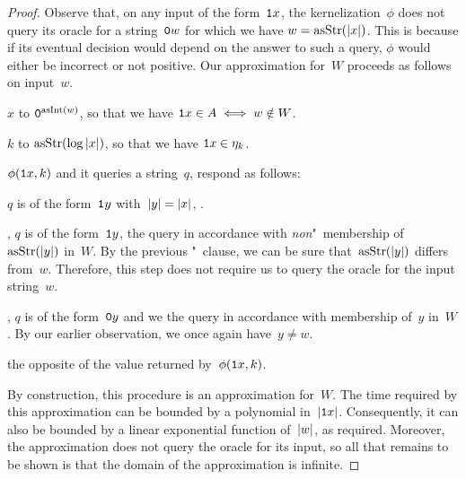\begin{proof}
  Observe that, on any input of the form~$\textnormal{\texttt{1}}x$, the kernelization~$\phi$ does not query its oracle for a string~$\textnormal{\texttt{0}}w$ for which we have $w = \operatorname{asStr}({\lvert x\rvert})$.
  This is because if its eventual decision would depend on the answer to such a query, $\phi$ would either be incorrect or not positive.
  Our approximation for~$W$ proceeds as follows on input~$w$.
  \begin{codelisting}
  \item
     $x$ to $\bits{0}^{\asNat(w)}$, so that we have $\bits{1}x \in A \iff w \notin W$.
  \item
     $k$ to $\asStr(\log \length{x})$, so that we have $\bits{1}x \in \eta_k$.
  \item
     $\phi(\bits{1}x, k)$ and  it queries a string~$q$, respond as follows:
    \begin{codelisting}
    \item\label{code:hpositive:not_self}%
       $q$ is of the form~$\bits{1}y$ with~$\length{y} = \length{x}$,  .
    \item
      ,  $q$ is of the form~$\bits{1}y$,  the query in accordance with \emph{non}"~membership of~$\asStr(\length{y})$ in~$W$.
      By the previous "~clause, we can be sure that~$\asStr(\length{y})$ differs from~$w$.
      Therefore, this step does not require us to query the oracle for the input string~$w$.
    \item
      , $q$ is of the form~$\bits{0}y$ and we  the query in accordance with membership of~$y$ in~$W$.
      By our earlier observation, we once again have~$y \neq w$.
    \end{codelisting}
    \item
       the opposite of the value returned by~$\phi(\textnormal{\texttt{1}}x, k)$.
  \end{codelisting}
  By construction, this procedure is an approximation for~$W$.
  The time required by this approximation can be bounded by a polynomial in~${\lvert\textnormal{\texttt{1}}x\rvert}$.
  Consequently, it can also be bounded by a linear exponential function of~${\lvert w\rvert}$, as required.
  Moreover, the approximation does not query the oracle for its input, so all that remains to be shown is that the domain of the approximation is infinite.


\end{proof}
